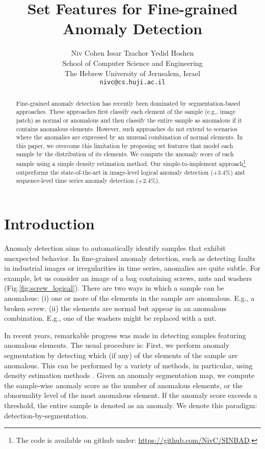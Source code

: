 \documentclass{article}
\title{Set Features for Fine-grained Anomaly Detection}
\author{\qquad Niv Cohen \qquad  Issar Tzachor \qquad Yedid Hoshen \\
School of Computer Science and Engineering \\
The Hebrew University of Jerusalem, Israel \\ 
  \texttt{nivc@cs.huji.ac.il} \\
}
\begin{document}
\maketitle


\begin{abstract}

Fine-grained anomaly detection has recently been dominated by segmentation-based approaches. These approaches first classify each element of the sample (e.g., image patch) as normal or anomalous and then classify the entire sample as anomalous if it contains anomalous elements. However, such approaches do not extend to scenarios where the anomalies are expressed by an unusual combination of normal elements. In this paper, we overcome this limitation by proposing set features that model each sample by the distribution of its elements. We compute the anomaly score of each sample using a simple density estimation method. Our simple-to-implement approach\footnote{The code is available on github under: \href{https://github.com/NivC/SINBAD}{https://github.com/NivC/SINBAD}.} outperforms the state-of-the-art in image-level logical anomaly detection ($+3.4 \%$) and sequence-level time series anomaly detection ($+2.4 \%$). 
\end{abstract}



\section{Introduction}

Anomaly detection aims to automatically identify samples that exhibit unexpected behavior. In fine-grained anomaly detection, such as detecting faults in industrial images or irregularities in time series, anomalies are quite subtle. For example, let us consider an image of a bag containing screws, nuts and washers (Fig.\ref{fig:screw_logical}). There are two ways in which a sample can be anomalous: (i) one or more of the elements in the sample are anomalous. E.g., a broken screw. (ii) the elements are normal but appear in an anomalous combination. E.g., one of the washers might be replaced with a nut.

In recent years, remarkable progress was made in detecting samples featuring anomalous elements. The usual procedure is:
First, we perform anomaly segmentation by detecting which (if any) of the elements of the sample are anomalous. This can be performed by a variety of methods, in particular, using density estimation methods \cite{cohen2020sub,defard2021padim,roth2022towards}. Given an anomaly segmentation map, we compute the sample-wise anomaly score as the number of anomalous elements, or the abnormality level of the most anomalous element. If the anomaly score exceeds a threshold, the entire sample is denoted as an anomaly. We denote this paradigm: detection-by-segmentation.
\end{document}
